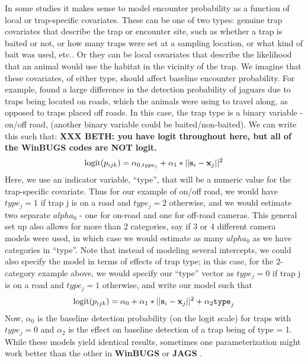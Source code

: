 In some studies it makes sense to model encounter probability as a
function of local or trap-specific covariates. These can be one of two
types: genuine trap covariates that describe the trap or encounter site,
such as whether a trap is baited or not, or how many traps were set at a sampling location,
or what kind of bait was used, etc.. Or they can be local covariates that
describe the likelihood that an animal would use the habitat in the
vicinity of the trap.
We imagine that these covariates, of either type, should affect
baseline encounter probability.
For example, \citet{sollmann_etal:2011}
found a large difference in the detection probability of jaguars due to traps
being located on roads, which the animals were using to travel along, as
opposed to traps placed off roads.  In this case, the trap
type is a binary variable - on/off road,
(another binary variable could be baited/non-baited).  We can write this such that:
{\bf 
XXX BETH: you have logit throughout here, but all of the WinBUGS codes
are NOT logit.
}
\[
\mbox{logit}(p_{ijk}) = \alpha_{0,type_j} + \alpha_1*||{\bf s}_{i}-{\bf x}_{j}||^{2}
\]
Here, we use an indicator variable, ``type'', that will be a numeric
value for the trap-specific covariate.  Thus for our example of on/off
road, we would have $type_j = 1$ if trap j is on a road and $type_j =
2$ otherwise, and we would estimate two separate $alpha_{0}$ - one for
on-road and one for off-road cameras.  This general set up also allows
for more than 2 categories, say if 3 or 4 different camera models were
used, in which case we would estimate as many $alpha_{0}$ as we have
categories in ``type''. Note that instead of modeling several
intercepts, we could also specify the model in terms of effects of
trap type; in this case, for the 2-category example above, we would
specify our ``type'' vector as $type_j = 0$ if trap j is on a road and
$type_j = 1$ otherwise, and write our model such that
\[
\mbox{logit}(p_{ijk}) = \alpha_{0} + \alpha_1*||{\bf s}_{i}-{\bf x}_{j}||^{2}
+ \alpha_{2} \mbox{\tt type}_{j}
\]
Now, $\alpha_{0}$ is the baseline detection probability (on the logit
scale) for traps with $type_j = 0$ and $\alpha_{2}$ is the effect on
baseline detection of a trap being of type = 1. While these models
yield identical results, sometimes one parameterization might work
better than the other in {\bf WinBUGS} or {\bf JAGS}
\citep{kery:2010}.
 
